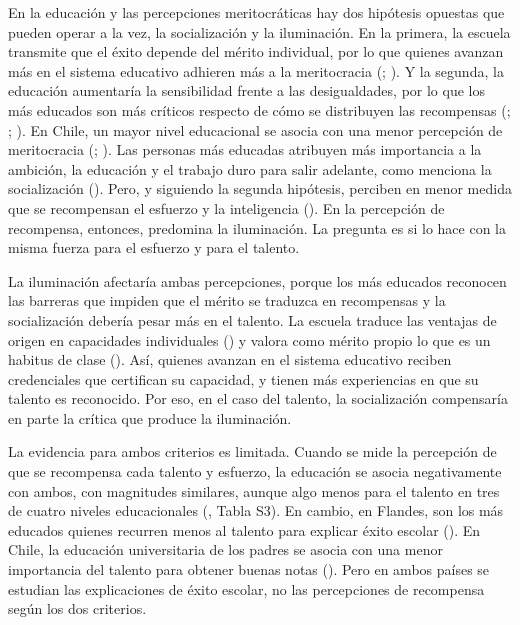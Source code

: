 \documentclass[
  spanish,
  a4paper,
  oneside]{scrbook}
\begin{document}
En la educación y las percepciones meritocráticas hay dos hipótesis
opuestas que pueden operar a la vez, la socialización y la iluminación.
En la primera, la escuela transmite que el éxito depende del mérito
individual, por lo que quienes avanzan más en el sistema educativo
adhieren más a la meritocracia
(;
). Y la segunda,
la educación aumentaría la sensibilidad frente a las desigualdades, por
lo que los más educados son más críticos respecto de cómo se distribuyen
las recompensas (;
;
). En Chile,
un mayor nivel educacional se asocia con una menor percepción de
meritocracia (;
). Las personas más educadas atribuyen más importancia a la
ambición, la educación y el trabajo duro para salir adelante, como
menciona la socialización
(). Pero, y siguiendo la segunda hipótesis, perciben en menor
medida que se recompensan el esfuerzo y la inteligencia
(). En la percepción de recompensa, entonces, predomina la
iluminación. La pregunta es si lo hace con la misma fuerza para el
esfuerzo y para el talento.

La iluminación afectaría ambas percepciones, porque los más educados
reconocen las barreras que impiden que el mérito se traduzca en
recompensas y la socialización debería pesar más en el talento. La
escuela traduce las ventajas de origen en capacidades individuales
() y
valora como mérito propio lo que es un habitus de clase
(). Así,
quienes avanzan en el sistema educativo reciben credenciales que
certifican su capacidad, y tienen más experiencias en que su talento es
reconocido. Por eso, en el caso del talento, la socialización
compensaría en parte la crítica que produce la iluminación.

La evidencia para ambos criterios es limitada. Cuando se mide la
percepción de que se recompensa cada talento y esfuerzo, la educación se
asocia negativamente con ambos, con magnitudes similares, aunque algo
menos para el talento en tres de cuatro niveles educacionales
(, Tabla S3). En cambio, en Flandes, son los más educados quienes
recurren menos al talento para explicar éxito escolar
(). En Chile, la educación universitaria de los padres se asocia con
una menor importancia del talento para obtener buenas notas
(). Pero en
ambos países se estudian las explicaciones de éxito escolar, no las
percepciones de recompensa según los dos criterios.
\end{document}
